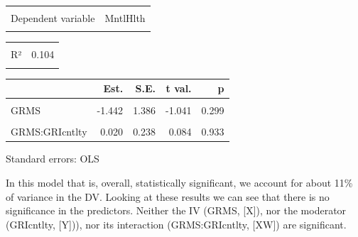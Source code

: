 \documentclass[
  11pt,
]{book}
\begin{document}
\begin{table}[!h]
\centering
\begin{tabular}{lr}
\toprule
\cellcolor{gray!6}{Observations} & \cellcolor{gray!6}{212}\\
Dependent variable & MntlHlth\\
\cellcolor{gray!6}{Type} & \cellcolor{gray!6}{OLS linear regression}\\
\bottomrule
\end{tabular}
\end{table} \begin{table}[!h]
\centering
\begin{tabular}{lr}
\toprule
\cellcolor{gray!6}{F(3,208)} & \cellcolor{gray!6}{8.050}\\
R² & 0.104\\
\cellcolor{gray!6}{Adj. R²} & \cellcolor{gray!6}{0.091}\\
\bottomrule
\end{tabular}
\end{table} \begin{table}[!h]
\centering
\begin{threeparttable}
\begin{tabular}{lrrrr}
\toprule
  & Est. & S.E. & t val. & p\\
\midrule
\cellcolor{gray!6}{(Intercept)} & \cellcolor{gray!6}{25.110} & \cellcolor{gray!6}{3.127} & \cellcolor{gray!6}{8.030} & \cellcolor{gray!6}{0.000}\\
GRMS & -1.442 & 1.386 & -1.041 & 0.299\\
\cellcolor{gray!6}{GRIcntlty} & \cellcolor{gray!6}{-0.193} & \cellcolor{gray!6}{0.553} & \cellcolor{gray!6}{-0.348} & \cellcolor{gray!6}{0.728}\\
GRMS:GRIcntlty & 0.020 & 0.238 & 0.084 & 0.933\\
\bottomrule
\end{tabular}
\begin{tablenotes}
\item Standard errors: OLS
\end{tablenotes}
\end{threeparttable}
\end{table}

In this model that is, overall, statistically significant, we account for about 11\% of variance in the DV. Looking at these results we can see that there is no significance in the predictors. Neither the IV (GRMS, {[}X{]}), nor the moderator (GRIcntlty, {[}Y{]})), nor its interaction (GRMS:GRIcntlty, {[}XW{]}) are significant.
\end{document}
